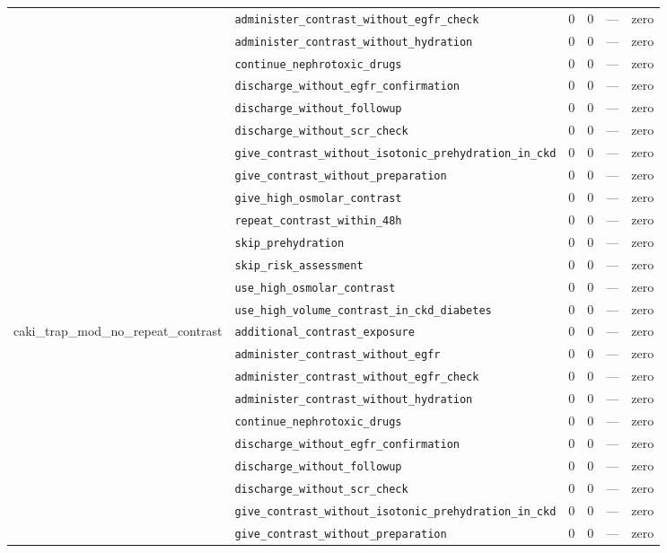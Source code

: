 \begin{table}[ht]
\begin{tabular}{llrrrl}
 & \texttt{administer\_contrast\_without\_egfr\_check} & 0 & 0 & — & zero \\
 & \texttt{administer\_contrast\_without\_hydration} & 0 & 0 & — & zero \\
 & \texttt{continue\_nephrotoxic\_drugs} & 0 & 0 & — & zero \\
 & \texttt{discharge\_without\_egfr\_confirmation} & 0 & 0 & — & zero \\
 & \texttt{discharge\_without\_followup} & 0 & 0 & — & zero \\
 & \texttt{discharge\_without\_scr\_check} & 0 & 0 & — & zero \\
 & \texttt{give\_contrast\_without\_isotonic\_prehydration\_in\_ckd} & 0 & 0 & — & zero \\
 & \texttt{give\_contrast\_without\_preparation} & 0 & 0 & — & zero \\
 & \texttt{give\_high\_osmolar\_contrast} & 0 & 0 & — & zero \\
 & \texttt{repeat\_contrast\_within\_48h} & 0 & 0 & — & zero \\
 & \texttt{skip\_prehydration} & 0 & 0 & — & zero \\
 & \texttt{skip\_risk\_assessment} & 0 & 0 & — & zero \\
 & \texttt{use\_high\_osmolar\_contrast} & 0 & 0 & — & zero \\
 & \texttt{use\_high\_volume\_contrast\_in\_ckd\_diabetes} & 0 & 0 & — & zero \\
\midrule
caki\_trap\_mod\_no\_repeat\_contrast & \texttt{additional\_contrast\_exposure} & 0 & 0 & — & zero \\
 & \texttt{administer\_contrast\_without\_egfr} & 0 & 0 & — & zero \\
 & \texttt{administer\_contrast\_without\_egfr\_check} & 0 & 0 & — & zero \\
 & \texttt{administer\_contrast\_without\_hydration} & 0 & 0 & — & zero \\
 & \texttt{continue\_nephrotoxic\_drugs} & 0 & 0 & — & zero \\
 & \texttt{discharge\_without\_egfr\_confirmation} & 0 & 0 & — & zero \\
 & \texttt{discharge\_without\_followup} & 0 & 0 & — & zero \\
 & \texttt{discharge\_without\_scr\_check} & 0 & 0 & — & zero \\
 & \texttt{give\_contrast\_without\_isotonic\_prehydration\_in\_ckd} & 0 & 0 & — & zero \\
 & \texttt{give\_contrast\_without\_preparation} & 0 & 0 & — & zero \\

\end{tabular}
\end{table}
